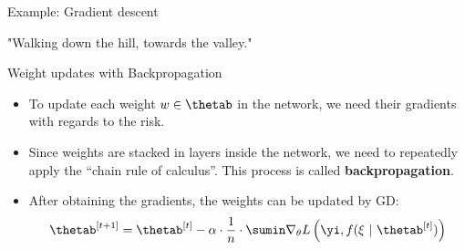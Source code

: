 \begin{vbframe}{Example: Gradient descent}
\begin{center}
\begin{figure}
\centering
{}
\end{figure}
\vspace{1 cm}
"Walking down the hill, towards the valley."
\end{center}
\end{vbframe}

\begin{vbframe}{Weight updates with Backpropagation}
\begin{itemize}
\lz
\item To update each weight $w \in \thetab$ in the network, we need their gradients with regards to the risk.
\lz
\lz
\item Since weights are stacked in layers inside the network, we need to repeatedly apply the \enquote{chain rule of calculus}. This process is called \textbf{backpropagation}.
\lz
\lz
\item After obtaining the gradients, the weights can be updated by GD:
$$\thetab^{[t + 1]} = \thetab^{[t]} - \alpha \cdot \frac{1}{n} \cdot \sumin \nabla_\theta L\left(\yi, f(\xi ~|~ \thetab^{[t]})\right)$$
\end{itemize}
\end{vbframe}

